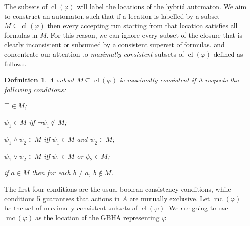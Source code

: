 \documentclass[submission,copyright,creativecommons]{eptcs}
\DeclareMathOperator{\cl}{cl}
\DeclareMathOperator{\cs}{mc}
\newtheorem{definition}{Definition}
\begin{document}
\noindent The subsets of $\cl(\varphi)$ will label the locations of the hybrid automaton.  We aim to construct an automaton such that if a location is labelled by a subset $M \subseteq \cl(\varphi)$ then every accepting run starting from that location satisfies all formulas in $M$. For this reason, we can ignore every subset of the closure that is clearly inconsistent or subsumed by a consistent superset of formulas, and concentrate our attention to \emph{maximally consistent} subsets of $\cl(\varphi)$ defined as follows.

\begin{definition}\label{def:maximally-consistent}
A subset $M \subseteq \cl(\varphi)$ is \emph{maximally consistent} if it respects the following conditions:
\begin{multicols}{2}
\begin{compactenum}
	\item $\top \in M$;
	\item $\psi_1 \in M$ iff $\neg{\psi_1} \not\in M$;
	\item $\psi_1 \land \psi_2 \in M$ iff $\psi_1 \in M$ and $\psi_2 \in M$;
	\item $\psi_1 \lor \psi_2 \in M$ iff $\psi_1 \in M$ or $\psi_2 \in M$;
	\item if  $a \in M$ then for each $b \neq a$, $b \not\in M$.
\end{compactenum}
\end{multicols}
\end{definition}

\noindent The first four conditions are the usual boolean consistency conditions, while conditions 5 guarantees that actions in $A$ are mutually exclusive.
Let $\cs(\varphi)$ be the set of maximally consistent subsets of $\cl(\varphi)$. We are going to use $\cs(\varphi)$ as the location of the GBHA representing $\varphi$.
\end{document}
